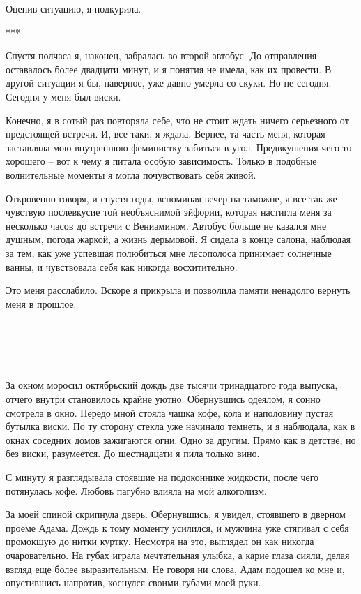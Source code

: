 \documentclass[
]{book}
\begin{document}
Оценив ситуацию, я подкурила.

***

Спустя полчаса я, наконец, забралась во второй автобус. До отправления оставалось более двадцати минут, и я понятия не имела, как их провести. В другой ситуации я бы, наверное, уже давно умерла со скуки. Но не сегодня. Сегодня у меня был виски.

Конечно, я в сотый раз повторяла себе, что не стоит ждать ничего серьезного от предстоящей встречи. И, все-таки, я ждала. Вернее, та часть меня, которая заставляла мою внутреннюю феминистку забиться в угол. Предвкушения чего-то хорошего -- вот к чему я питала особую зависимость. Только в подобные волнительные моменты я могла почувствовать себя живой.

Откровенно говоря, и спустя годы, вспоминая вечер на таможне, я все так же чувствую послевкусие той необъяснимой эйфории, которая настигла меня за несколько часов до встречи с Вениамином. Автобус больше не казался мне душным, погода жаркой, а жизнь дерьмовой. Я сидела в конце салона, наблюдая за тем, как уже успевшая полюбиться мне лесополоса принимает солнечные ванны, и чувствовала себя как никогда восхитительно.

Это меня расслабило. Вскоре я прикрыла и позволила памяти ненадолго вернуть меня в прошлое.

\hypertarget{chapter-6}{%
\chapter{~}\label{chapter-6}}

За окном моросил октябрьский дождь две тысячи тринадцатого года выпуска, отчего внутри становилось крайне уютно. Обернувшись одеялом, я сонно смотрела в окно. Передо мной стояла чашка кофе, кола и наполовину пустая бутылка виски. По ту сторону стекла уже начинало темнеть, и я наблюдала, как в окнах соседних домов зажигаются огни. Одно за другим. Прямо как в детстве, но без виски, разумеется. До шестнадцати я пила только вино.

С минуту я разглядывала стоявшие на подоконнике жидкости, после чего потянулась кофе. Любовь пагубно влияла на мой алкоголизм.

За моей спиной скрипнула дверь. Обернувшись, я увидел, стоявшего в дверном проеме Адама. Дождь к тому моменту усилился, и мужчина уже стягивал с себя промокшую до нитки куртку. Несмотря на это, выглядел он как никогда очаровательно. На губах играла мечтательная улыбка, а карие глаза сияли, делая взгляд еще более выразительным. Не говоря ни слова, Адам подошел ко мне и, опустившись напротив, коснулся своими губами моей руки.
\end{document}
